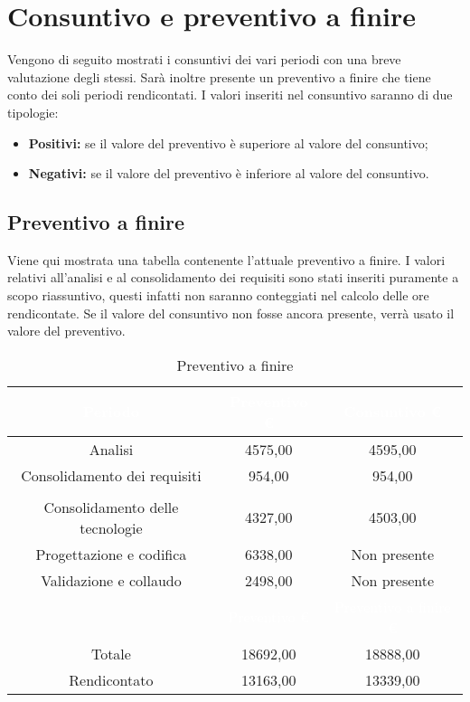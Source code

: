 \section{Consuntivo e preventivo a finire}
\label{consuntivo_preventivo_a_finire}
Vengono di seguito mostrati i consuntivi dei vari periodi con una breve valutazione degli stessi. Sarà inoltre presente un preventivo a finire che tiene conto dei soli periodi rendicontati. I valori inseriti nel consuntivo saranno di due tipologie:
\begin{itemize}
	\item \textbf{Positivi:} se il valore del preventivo è superiore al valore del consuntivo;
	\item \textbf{Negativi:} se il valore del preventivo è inferiore al valore del consuntivo.
\end{itemize}



\subsection{Preventivo a finire}\label{Paf}
Viene qui mostrata una tabella contenente l'attuale preventivo a finire. I valori relativi all'analisi e al consolidamento dei requisiti sono stati inseriti puramente a scopo riassuntivo, questi infatti non saranno conteggiati nel calcolo delle ore rendicontate. Se il valore del consuntivo non fosse ancora presente, verrà usato il valore del preventivo.
\begin{table}[H]
	\centering
	\begin{tabular}{|c|c|c|}
	\rowcolor{darkblue} 
		\textcolor{white}{Periodo}		&\textcolor{white}{Preventivo €}&	\textcolor{white}{Consuntivo €}\\ \hline
		Analisi							&	4575,00						&	4595,00 \\ \hline
		Consolidamento dei requisiti	&	954,00						&	954,00 \\ \hline
		\rowcolor{darkblue} \multicolumn{3}{|c|}{\textcolor{white}{Rendicontato}}\\ \hline
		Consolidamento delle tecnologie	&	4327,00						&	4503,00 \\ \hline
		Progettazione e codifica		&	6338,00						&	Non presente \\ \hline
		Validazione e collaudo			&	2498,00						&	Non presente \\ \hline
		\rowcolor{darkblue}				&\textcolor{white}{Preventivo €}&	\textcolor{white}{Preventivo a finire €}\\ \hline
		Totale							&	18692,00					&	18888,00 \\ \hline
		Rendicontato					&	13163,00					&	13339,00 \\ \hline
	\end{tabular}
	\caption{Preventivo a finire}
\end{table}